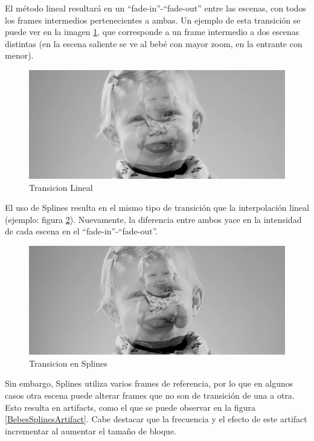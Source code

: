 \par El m\'etodo lineal resultar\'a en un ``fade-in''-``fade-out'' entre las escenas, con todos los frames intermedios pertenecientes a ambas.
Un ejemplo de esta transici\'on se puede ver en la imagen \ref{BebesLinealTransicion}, que corresponde a un frame intermedio a dos escenas distintas (en la escena saliente se ve al beb\'e con mayor zoom, en la entrante con menor).

\FloatBarrier
\begin{figure}[h]
\caption{Transicion Lineal}
\label{BebesLinealTransicion}
\includegraphics[width=0.9\columnwidth]{imagenes/cualitativos/BLT.png}
\end{figure}
\FloatBarrier

\par El uso de Splines resulta en el mismo tipo de transici\'on que la interpolaci\'on lineal (ejemplo: figura \ref{BebesSplinesTransicion}).
Nuevamente, la diferencia entre ambos yace en la intensidad de cada escena en el ``fade-in''-``fade-out''.

\FloatBarrier
\begin{figure}[h]
\caption{Transicion en Splines}
\label{BebesSplinesTransicion}
\includegraphics[width=0.9\columnwidth]{imagenes/cualitativos/BST.png}
\end{figure}
\FloatBarrier

\par Sin embargo, Splines utiliza varios frames de referencia, por lo que en algunos casos otra escena puede alterar frames que no son de transici\'on de una a otra.
Esto resulta en artifacts, como el que se puede observar en la figura \ref{BebesSplinesArtifact}.
Cabe destacar que la frecuencia y el efecto de este artifact incrementar al aumentar el tama\~no de bloque.

